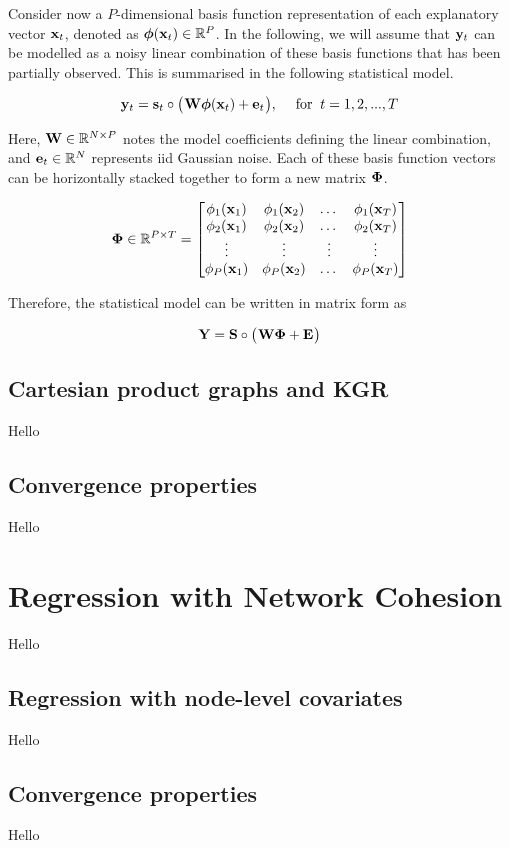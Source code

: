 Consider now a $P$-dimensional basis function representation of each explanatory vector $\mathbf{x}_t$, denoted as $\boldsymbol{\phi}(\mathbf{x}_t) \in \mathbb{R}^{P}$. In the following, we will assume that $\mathbf{y}_t$ can be modelled as a noisy linear combination of these basis functions that has been partially observed. This is summarised in the following statistical model. 

\begin{equation}
    \mathbf{y}_t = \mathbf{s}_t \circ \big( \mspace{1mu} \mathbf{W} \boldsymbol{\phi}(\mathbf{x}_t) + \mathbf{e}_t \mspace{1mu} \big), \quad \; \text{for} \; \; t = 1, 2, ..., T
\end{equation}

Here, $\mathbf{W} \in \mathbb{R}^{N \times P}$ notes the model coefficients defining the linear combination, and $\mathbf{e}_t \in \mathbb{R}^{N}$ represents iid Gaussian noise. Each of these basis function vectors can be horizontally stacked together to form a new matrix $\mathbf{\Phi}$. 

\begin{equation}
    \mathbf{\Phi} \in \mathbb{R}^{P \times T} = \begin{bmatrix} 
        \phi_1(\mathbf{x}_1) & \phi_1(\mathbf{x}_2) & \dots & \phi_1(\mathbf{x}_T) \\
        \phi_2(\mathbf{x}_1) & \phi_2(\mathbf{x}_2) & \dots & \phi_2(\mathbf{x}_T) \\
        \vdots & \vdots & \vdots & \vdots  \\
        \phi_P(\mathbf{x}_1) & \phi_P(\mathbf{x}_2) & \dots & \phi_P(\mathbf{x}_T) \\
    \end{bmatrix}
\end{equation}

Therefore, the statistical model can be written in matrix form as 


\begin{equation}
    \mathbf{Y} = \mathbf{S} \circ \big( \mspace{1mu} \mathbf{W} \mathbf{\Phi} + \mathbf{E} \mspace{1mu} \big)
\end{equation}



\subsection{Cartesian product graphs and KGR}

Hello

\subsection{Convergence properties}

Hello


\section{Regression with Network Cohesion}

\label{sec:rnc_mdp}

Hello

\subsection{Regression with node-level covariates}

Hello

\subsection{Convergence properties}

Hello